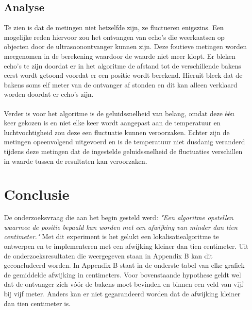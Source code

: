 \documentclass{article}
\begin{document}
\subsection{Analyse}
Te zien is dat de metingen niet hetzelfde zijn, ze fluctueren enigszins. Een mogelijke reden hiervoor zou 
het ontvangen van echo's die weerkaatsen op objecten door de ultrasoonontvanger kunnen zijn. Deze foutieve metingen worden meegenomen in de berekening waardoor de waarde niet meer klopt. Er bleken echo's te zijn doordat er in het algoritme de afstand tot de verschillende bakens eerst wordt getoond voordat er een positie wordt berekend. Hieruit bleek dat de bakens soms elf meter van de ontvanger af stonden en dit kan alleen verklaard worden doordat er echo's zijn.\\
\\
Verder is voor het algoritme is de geluidssnelheid van belang, omdat deze \'{e}\'{e}n keer gekozen is en niet elke keer wordt aangepast aan de temperatuur en luchtvochtigheid zou deze een fluctuatie kunnen veroorzaken. Echter zijn de metingen opeenvolgend uitgevoerd en is de temperatuur niet dusdanig veranderd tijdens deze metingen dat de ingestelde geluidssnelheid de fluctuaties verschillen in waarde tussen de resultaten kan veroorzaken.

\section{Conclusie}
De onderzoeksvraag die aan het begin gesteld werd: \textit{"Een algoritme opstellen waarmee de positie bepaald kan worden met een afwijking van minder dan tien centimeter."} Met dit experiment is het gelukt een lokalisatiealgoritme te ontwerpen en te implementeren met een afwijking kleiner dan tien centimeter. Uit de onderzoeksresultaten die weergegeven staan in Appendix B kan dit geconcludeerd worden. In Appendix B staat in de onderste tabel van elke grafiek de gemiddelde afwijking in centimeters. Voor bovenstaande hypothese geldt wel dat de ontvanger zich v\'{o}\'{o}r de bakens moet bevinden en binnen een veld van vijf bij vijf meter. Anders kan er niet gegarandeerd worden dat de afwijking kleiner dan tien centimeter is. 
\end{document}
